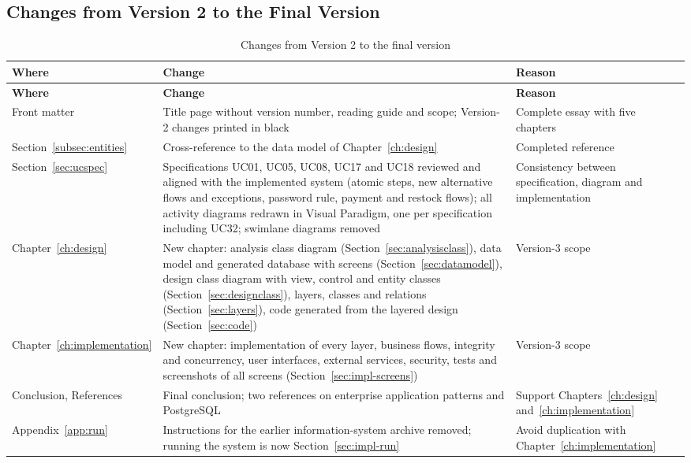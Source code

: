 \documentclass[11pt,a4paper,oneside]{extreport}
\begin{document}
\subsection*{Changes from Version 2 to the Final Version}
{\small
\begin{xltabular}{\textwidth}{@{}L{3.2cm} Y L{3.6cm}@{}}
\caption{Changes from Version 2 to the final version}\label{tab:v3changes}\\
\toprule
\textbf{Where} & \textbf{Change} & \textbf{Reason} \\ \midrule
\endfirsthead
\toprule
\textbf{Where} & \textbf{Change} & \textbf{Reason} \\ \midrule
\endhead
\bottomrule
\endlastfoot
Front matter & Title page without version number, reading guide and scope; Version-2 changes printed in black & Complete essay with five chapters \\
Section~\ref{subsec:entities} & Cross-reference to the data model of Chapter~\ref{ch:design} & Completed reference \\
Section~\ref{sec:ucspec} & Specifications UC01, UC05, UC08, UC17 and UC18 reviewed and aligned with the implemented system (atomic steps, new alternative flows and exceptions, password rule, payment and restock flows); all activity diagrams redrawn in Visual Paradigm, one per specification including UC32; swimlane diagrams removed & Consistency between specification, diagram and implementation \\
Chapter~\ref{ch:design} & New chapter: analysis class diagram (Section~\ref{sec:analysisclass}), data model and generated database with screens (Section~\ref{sec:datamodel}), design class diagram with view, control and entity classes (Section~\ref{sec:designclass}), layers, classes and relations (Section~\ref{sec:layers}), code generated from the layered design (Section~\ref{sec:code}) & Version-3 scope \\
Chapter~\ref{ch:implementation} & New chapter: implementation of every layer, business flows, integrity and concurrency, user interfaces, external services, security, tests and screenshots of all screens (Section~\ref{sec:impl-screens}) & Version-3 scope \\
Conclusion, References & Final conclusion; two references on enterprise application patterns and PostgreSQL & Support Chapters~\ref{ch:design} and~\ref{ch:implementation} \\
Appendix~\ref{app:run} & Instructions for the earlier information-system archive removed; running the system is now Section~\ref{sec:impl-run} & Avoid duplication with Chapter~\ref{ch:implementation} \\
\end{xltabular}
}
\end{document}
